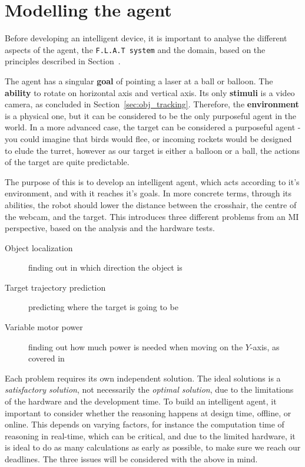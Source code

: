 \section{Modelling the agent}\label{Design:MI}
Before developing an intelligent device, it is important to analyse the different aspects of the agent, the \texttt{F.L.A.T system} and the domain, based on the principles described in Section~.


The agent has a singular \textbf{goal} of pointing a laser at a ball or balloon.
The \textbf{ability} to rotate on horizontal axis and vertical axis.
Its only \textbf{stimuli} is a video camera, as concluded in Section~\ref{sec:obj_tracking}.
Therefore, the \textbf{environment} is a physical one, but it can be considered to be the only purposeful agent in the world.
In a more advanced case, the target can be considered a purposeful agent - you could imagine that birds would flee, or incoming rockets would be designed to elude the turret, however as our target is either a balloon or a ball, the actions of the target are quite predictable.

The purpose of this is to develop an intelligent agent, which acts according to it's environment, and with it reaches it's goals.
In more concrete terms, through its abilities, the robot should lower the distance between the crosshair, the centre of the webcam, and the target.
This introduces three different problems from an MI perspective, based on the analysis and the hardware tests.
\begin{description}
	\item[Object localization] finding out in which direction the object is
	\item[Target trajectory prediction] predicting where the target is going to be
	\item[Variable motor power] finding out how much power is needed when moving on the $Y$-axis, as covered in
\end{description}


Each problem requires its own independent solution.
The ideal solutions is a \textit{satisfactory solution}, not necessarily the \textit{optimal solution}, due to the limitations of the hardware and the development time.
To build an intelligent agent, it important to consider whether the reasoning happens at design time, offline, or online.
This depends on varying factors, for instance the computation time of reasoning in real-time, which can be critical, and due to the limited hardware, it is ideal to do as many calculations as early as possible, to make sure we reach our deadlines.
The three issues will be considered with the above in mind.

